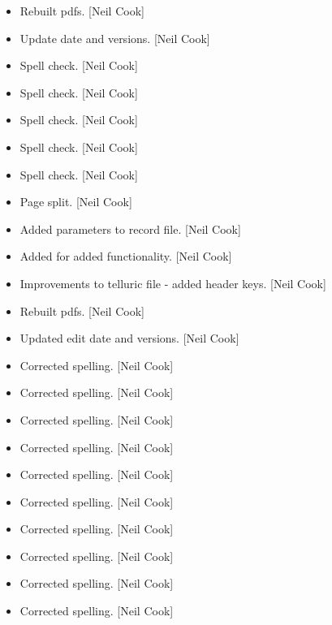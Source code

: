 \documentclass[a4paper,10pt,english]{report}
\begin{document}
\begin{itemize}
\item {} 
Rebuilt pdfs. {[}Neil Cook{]}

\item {} 
Update date and versions. {[}Neil Cook{]}

\item {} 
Spell check. {[}Neil Cook{]}

\item {} 
Spell check. {[}Neil Cook{]}

\item {} 
Spell check. {[}Neil Cook{]}

\item {} 
Spell check. {[}Neil Cook{]}

\item {} 
Spell check. {[}Neil Cook{]}

\item {} 
Page split. {[}Neil Cook{]}

\item {} 
Added parameters to record file. {[}Neil Cook{]}

\item {} 
Added  for added functionality. {[}Neil Cook{]}

\item {} 
Improvements to telluric file - added header keys. {[}Neil Cook{]}

\item {} 
Rebuilt pdfs. {[}Neil Cook{]}

\item {} 
Updated edit date and versions. {[}Neil Cook{]}

\item {} 
Corrected spelling. {[}Neil Cook{]}

\item {} 
Corrected spelling. {[}Neil Cook{]}

\item {} 
Corrected spelling. {[}Neil Cook{]}

\item {} 
Corrected spelling. {[}Neil Cook{]}

\item {} 
Corrected spelling. {[}Neil Cook{]}

\item {} 
Corrected spelling. {[}Neil Cook{]}

\item {} 
Corrected spelling. {[}Neil Cook{]}

\item {} 
Corrected spelling. {[}Neil Cook{]}

\item {} 
Corrected spelling. {[}Neil Cook{]}

\item {} 
Corrected spelling. {[}Neil Cook{]}

\end{itemize}
\end{document}
